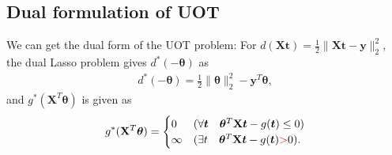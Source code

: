 \documentclass[twoside]{article}
\theoremstyle{plain}
\newcommand{\tranT}{T}
\newcommand{\mat}[1]{\mathbf{#1}}
\renewcommand{\vec}[1]{\bm{#1}}
\newcommand{\changeHK}[1]{\textcolor{red}{#1}}
\begin{document}
\subsection{Dual formulation of UOT}

We can get the dual form of the UOT problem: 
For $d(\mat{X} \vec{t}) = \frac{1}{2}\|\mat{X} \vec{t}-\vec{y}\|_2^2$, the dual Lasso problem gives $d^*(-\vec{\theta})$ as
 \begin{equation}
\begin{split} 
d^*(-\vec{\theta}) = \frac{1}{2}\|\vec{\theta}\|_2^2-{\vec{y}^T\vec{\theta}},
 \end{split}
\end{equation}
and  $g^*(\mat{X}^{\tranT}\vec{\theta})$ is given as
 \begin{equation*}
\begin{split} 
g^*(\mat{X}^{\tranT}\vec{\theta}) = 
\begin{cases}
0 & (\forall \vec{t} \quad\vec{\theta}^{\tranT}\mat{X}\vec{t} - g(\vec{t}) \leq 0 )\\
\infty &( \exists t \quad\vec{\theta}^{\tranT}\mat{X}\vec{t} - g(\vec{t}) \changeHK{>} 0 ).
\end{cases}
 \end{split}
\end{equation*}
\end{document}
